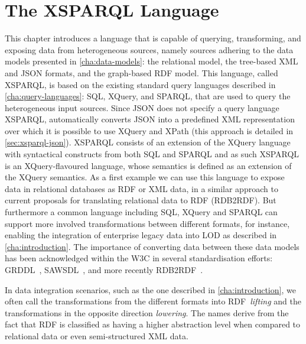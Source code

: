 \chapter{The XSPARQL Language}
\label{cha:xsparql}


This chapter introduces a language that is capable of querying, transforming, and exposing data from heterogeneous
sources, namely sources adhering to the data models presented in \cref{cha:data-models}: the relational model,
the tree-based \ac{XML} and \ac{JSON} formats, and the graph-based \ac{RDF} model.
%
This language, called XSPARQL, is based on the existing standard query languages described in
\cref{cha:query-languages}: \ac{SQL}, XQuery, and SPARQL, that are used to query the heterogeneous input sources.
%
Since \ac{JSON} does not specify a query language XSPARQL, automatically converts \ac{JSON} into a predefined \ac{XML}
representation over which it is possible to use XQuery and XPath (this approach is detailed in \cref{sec:xsparql-json}).
%
XSPARQL consists of an extension of the XQuery language with syntactical constructs from both \ac{SQL} and SPARQL and as
such XSPARQL is an XQuery-flavoured language, whose semantics is defined as an extension of the XQuery
semantics.
%
As a first example we can use this language to expose data in relational databases as \ac{RDF} or \ac{XML} data, in a
similar approach to current proposals for translating relational data to \ac{RDF} (RDB2RDF).  But furthermore a common
language including \ac{SQL}, XQuery and SPARQL can support more involved transformations between different formats, for
instance, enabling the integration of enterprise legacy data into \ac{LOD} as described in \cref{cha:introduction}.
%
The importance of converting data between these data models has been acknowledged within the \ac{W3C} in several
standardisation efforts: \ac{GRDDL}~\cite{Connolly:2007aa}, \ac{SAWSDL}~\cite{FarrellLausen:2007aa}, and more recently
RDB2RDF~\cite{ArenasPrudhommeauxSequeda:2011aa,DasSundaraCyganiak:2011aa}.


In data integration scenarios, such as the one described in \cref{cha:introduction}, we often call the transformations
from the different formats into \ac{RDF}~\emph{lifting} and the transformations in the opposite direction
\emph{lowering}.  The names derive from the fact that \ac{RDF} is classified as having a higher abstraction level when
compared to relational data or even semi-structured \ac{XML} data.

